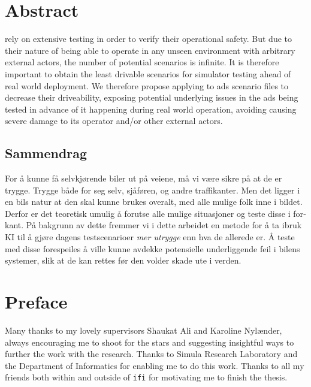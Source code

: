 \chapter*{Abstract}

 rely on extensive testing in order to verify their operational safety. But due to
their nature of being able to operate in any unseen environment with arbitrary external actors,
the number of potential scenarios is infinite. It is therefore important to obtain the least
drivable scenarios for simulator testing ahead of real world deployment. We therefore propose
applying  to \acrlong{ads} scenario files to decrease their driveability, exposing
potential underlying issues in the \acrshort{ads} being tested in advance of it happening during
real world operation, avoiding causing severe damage to its operator and/or other external actors.


\begin{otherlanguage}{norsk}
    \section*{Sammendrag}
    For å kunne få selvkjørende biler ut på veiene, må vi være sikre på at de er trygge. Trygge både
    for seg selv, sjåføren, og andre traffikanter. Men det ligger i en bils natur at den skal kunne
    brukes overalt, med alle mulige folk inne i bildet. Derfor er det teoretisk umulig å forutse
    alle mulige situasjoner og teste disse i forkant. På bakgrunn av dette fremmer vi i dette
    arbeidet en metode for å ta ibruk KI til å gjøre dagens testscenarioer \textit{mer utrygge} enn
    hva de allerede er. Å teste med disse forespeiles å ville kunne avdekke potensielle
    underliggende feil i bilens systemer, slik at de kan rettes før den volder skade ute i verden.
\end{otherlanguage}

\chapter*{Preface}

Many thanks to my lovely supervisors Shaukat Ali and Karoline Nylænder, always encouraging me to
shoot for the stars and suggesting insightful ways to further the work with the research. Thanks to
Simula Research Laboratory and the Department of Informatics for enabling me to do this work. Thanks
to all my friends both within and outside of \texttt{ifi} for motivating me to finish the thesis.

